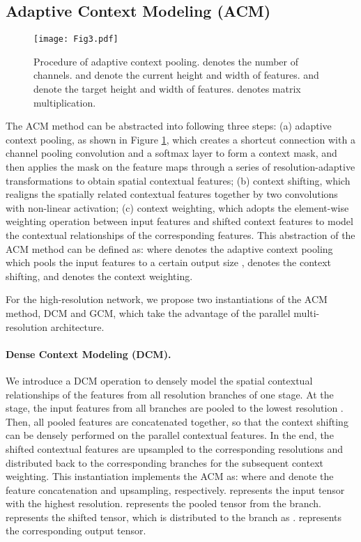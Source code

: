 \documentclass{article}
\begin{document}
\subsection{Adaptive Context Modeling (ACM)}

\begin{figure}[t]
\centering
\texttt{[image: Fig3.pdf]}
\caption{Procedure of adaptive context pooling.  denotes the number of channels.  and  denote the current height and width of features.  and  denote the target height and width of features.  denotes matrix multiplication.}
\label{fig3}
\end{figure}

The ACM method can be abstracted into following three steps: (a) adaptive context pooling, as shown in Figure \ref{fig3}, which creates a shortcut connection with a  channel pooling convolution and a softmax layer to form a context mask, and then applies the mask on the feature maps through a series of resolution-adaptive transformations to obtain spatial contextual features; (b) context shifting, which realigns the spatially related contextual features together by two  convolutions with non-linear activation; (c) context weighting, which adopts the element-wise weighting operation between input features and shifted context features to model the contextual relationships of the corresponding features. This abstraction of the ACM method can be defined as:
where  denotes the adaptive context pooling which pools the input features  to a certain output size ,  denotes the context shifting, and  denotes the context weighting.

For the high-resolution network, we propose two instantiations of the ACM method, DCM and GCM, which take the advantage of the parallel multi-resolution architecture.

\paragraph{Dense Context Modeling (DCM).} We introduce a DCM operation to densely model the spatial contextual relationships of the features from all resolution branches of one stage. At the  stage, the input features from all  branches are pooled to the lowest resolution . Then, all pooled features are concatenated together, so that the context shifting can be densely performed on the parallel contextual features. In the end, the shifted contextual features are upsampled to the corresponding resolutions and distributed back to the corresponding branches for the subsequent context weighting. This instantiation implements the ACM as:
where  and  denote the feature concatenation and upsampling, respectively.  represents the input tensor with the  highest resolution.  represents the pooled tensor from the  branch.  represents the shifted tensor, which is distributed to the  branch as .  represents the corresponding  output tensor.
\end{document}

